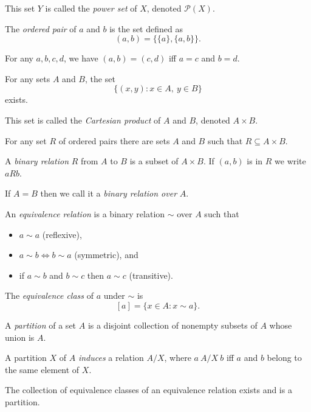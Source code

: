 \begin{defn}
  This set $Y$ is called the \emph{power set} of $X$, denoted $\mathcal P(X)$.
\end{defn}
\begin{defn}
  The \emph{ordered pair} of $a$ and $b$ is the set defined as
  \[(a,b)=\{\{a\},\{a,b\}\}.\]
\end{defn}
\begin{prop}
  For any $a,b,c,d$, we have $(a,b)=(c,d)$ iff $a=c$ and $b=d$.
\end{prop}
\begin{prop}
  For any sets $A$ and $B$, the set
  \[\{(x,y): x\in A,\ y\in B\}\]
  exists.
\end{prop}
\begin{defn}
  This set is called the \emph{Cartesian product} of $A$ and $B$, denoted
  $A\times B$.
\end{defn}
\begin{prop}
  For any set $R$ of ordered pairs there are sets $A$ and $B$ such that
  $R\subseteq A\times B$.
\end{prop}
\begin{defn}
  A \emph{binary relation} $R$ from $A$ to $B$ is a subset of $A\times
  B$. If $(a,b)$ is in $R$ we write $aRb$.

  If $A=B$ then we call it a \emph{binary relation over} $A$.
\end{defn}
\begin{defn}
  An \emph{equivalence relation} is a binary relation $\sim$ over $A$ such
  that
  \begin{itemize}
    \item $a\sim a$ (reflexive),
    \item $a\sim b\iff b\sim a$ (symmetric), and
    \item if $a\sim b$ and $b\sim c$ then $a\sim c$ (transitive).
  \end{itemize}
  The \emph{equivalence class} of $a$ under $\sim$ is
  \[[a]=\{x\in A:x\sim a\}.\]
\end{defn}
\begin{defn}
  A \emph{partition} of a set $A$ is a disjoint collection of nonempty subsets
  of $A$ whose union is $A$.

  A partition $X$ of $A$ \emph{induces} a relation $A/X$, where $a\ A/X\ b$ iff
  $a$ and $b$ belong to the same element of $X$.
\end{defn}
\begin{prop}
  The collection of equivalence classes of an equivalence relation exists and 
  is a partition.
\end{prop}
